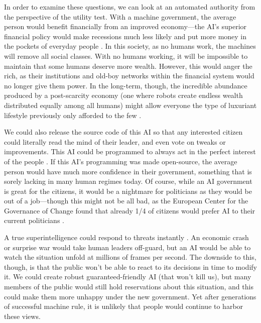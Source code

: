 \documentclass[12pt]{article}
\begin{document}

In order to examine these questions, we can look at an automated authority from the perspective of the utility test. With a machine government, the average person would benefit financially from an improved economy---the AI's superior financial policy would make recessions much less likely and put more money in the pockets of everyday people \cite{ernst2018economics}. In this society, as no humans work, the machines will remove all social classes. With no humans working, it will be impossible to maintain that some humans deserve more wealth. However, this would anger the rich, as their institutions and old-boy networks within the financial system would no longer give them power. In the long-term, though, the incredible abundance produced by a post-scarcity economy (one where robots create endless wealth distributed equally among all humans) might allow everyone the type of luxuriant lifestyle previously only afforded to the few \cite{korinek2017artificial}.

We could also release the source code of this AI so that any interested citizen could literally read the mind of their leader, and even vote on tweaks or improvements. This AI could be programmed to always act in the perfect interest of the people \cite{bostrom2014superintelligence}. If this AI's programming was made open-source, the average person would have much more confidence in their government, something that is sorely lacking in many human regimes today. Of course, while an AI government is great for the citizens, it would be a nightmare for politicians as they would be out of a job---though this might not be all bad, as the European Center for the Governance of Change found that already 1/4 of citizens would prefer AI to their current politicians \cite{euro2019tech}.

A true superintelligence could respond to threats instantly \cite{bostrom2014superintelligence}. An economic crash or surprise war would take human leaders off-guard, but an AI would be able to watch the situation unfold at millions of frames per second. The downside to this, though, is that the public won't be able to react to its decisions in time to modify it. We could create robust guaranteed-friendly AI (that won't kill us), but many members of the public would still hold reservations about this situation, and this could make them more unhappy under the new government. Yet after generations of successful machine rule, it is unlikely that people would continue to harbor these views.
\end{document}
